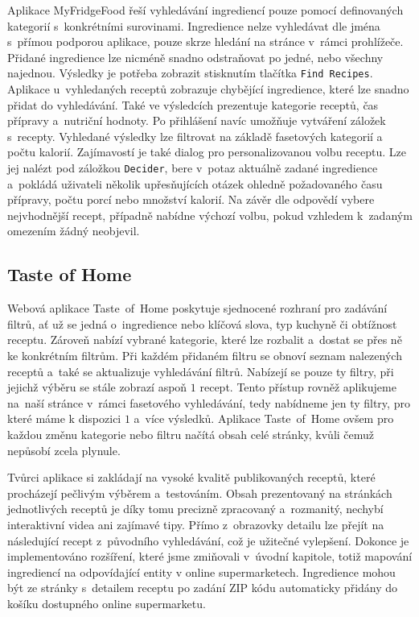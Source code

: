 Aplikace MyFridgeFood řeší vyhledávání ingrediencí pouze pomocí definovaných kategorií s~konkrétními surovinami. Ingredience nelze vyhledávat dle jména s~přímou podporou aplikace, pouze skrze hledání na stránce v~rámci prohlížeče. Přidané ingredience lze nicméně snadno odstraňovat po jedné, nebo všechny najednou. Výsledky je potřeba zobrazit stisknutím tlačítka \texttt{Find Recipes}. Aplikace u~vyhledaných receptů zobrazuje chybějící ingredience, které lze snadno přidat do vyhledávání. Také ve výsledcích prezentuje kategorie receptů, čas přípravy a~nutriční hodnoty. Po přihlášení navíc umožňuje vytváření záložek s~recepty. Vyhledané výsledky lze filtrovat na základě fasetových kategorií a počtu kalorií. Zajímavostí je také dialog pro personalizovanou volbu receptu. Lze jej nalézt pod záložkou \texttt{Decider}, bere v~potaz aktuálně zadané ingredience a~pokládá uživateli několik upřesňujících otázek ohledně požadovaného času přípravy, počtu porcí nebo množství kalorií. Na závěr dle odpovědí vybere nejvhodnější recept, případně nabídne výchozí volbu, pokud vzhledem k~zadaným omezením žádný neobjevil.

\subsection{Taste of Home}

Webová aplikace Taste~of~Home poskytuje sjednocené rozhraní pro zadávání filtrů, ať už se jedná o~ingredience nebo klíčová slova, typ kuchyně či obtížnost receptu. Zároveň nabízí vybrané kategorie, které lze rozbalit a~dostat se přes ně ke konkrétním filtrům. Při každém přidaném filtru se obnoví seznam nalezených receptů a~také se aktualizuje vyhledávání filtrů. Nabízejí se pouze ty filtry, při jejichž výběru se stále zobrazí aspoň $1$ recept. Tento přístup rovněž aplikujeme na~naší stránce v~rámci fasetového vyhledávání, tedy nabídneme jen ty filtry, pro které máme k dispozici $1$ a~více výsledků. Aplikace Taste~of~Home ovšem pro každou změnu kategorie nebo filtru načítá obsah celé stránky, kvůli čemuž nepůsobí zcela plynule.

Tvůrci aplikace si zakládají na vysoké kvalitě publikovaných receptů, které procházejí pečlivým výběrem a~testováním. Obsah prezentovaný na stránkách jednotlivých receptů je díky tomu precizně zpracovaný a~rozmanitý, nechybí interaktivní videa ani zajímavé tipy. Přímo z~obrazovky detailu lze přejít na následující recept z~původního vyhledávání, což je užitečné vylepšení. Dokonce je implementováno rozšíření, které jsme zmiňovali v~úvodní kapitole, totiž mapování ingrediencí na odpovídající entity v online supermarketech. Ingredience mohou být ze stránky s~detailem receptu po zadání ZIP kódu automaticky přidány do košíku dostupného online supermarketu.

